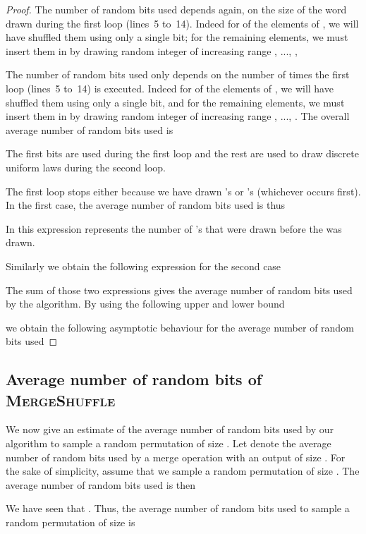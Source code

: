 \documentclass[letter,11pt,en]{quick-document}
\begin{document}
\begin{proof}
The number of random bits used depends again, on the size  of the
word~ drawn during the first loop (lines~5 to~14). Indeed for 
of the elements of , we will have shuffled them using only a single
bit; for the remaining  elements, we must insert them in 
by drawing random integer of increasing range , ..., ,

The number of random bits used only depends on the number of times the
first loop (lines~5 to~14) is executed. Indeed for  of the elements
of , we will have shuffled them using only a single bit, and for the
remaining  elements, we must insert them in  by drawing
random integer of increasing range , ..., . The overall average
number of random bits used is

The first  bits are used during the first loop and the rest are used to
draw discrete uniform laws during the second loop.

The first loop stops either because we have drawn  's or 
's (whichever occurs first). In the first case, the average number of
random bits used is thus

In this expression  represents the number of 's that were drawn before the   was drawn.

Similarly we obtain the following expression for the second case


The sum of those two expressions gives the average number of random bits used by the algorithm. By using the following upper and lower bound

we obtain the following asymptotic behaviour for the average number of random bits used

\end{proof}


\subsection{Average number of random bits of \textsc{MergeShuffle}}

We now give an estimate of the average number of random bits used by our
algorithm to sample a random permutation of size . Let  denote
the average number of random bits used by a merge operation with an output
of size . For the sake of simplicity, assume that we sample a random
permutation of size . The average number of random bits used is
then


We have seen that . Thus, the
average number of random bits used to sample a random permutation of size
 is
\end{document}
